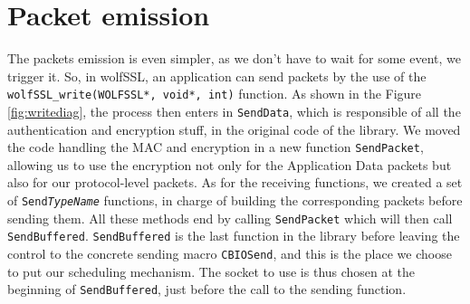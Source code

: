 \section{Packet emission}

The packets emission is even simpler, as we don't have to wait for some event, we trigger it. So, in wolfSSL, an application can send packets by the use of the \texttt{wolfSSL\_write(WOLFSSL*, void*, int)} function. As shown in the Figure \ref{fig:writediag}, the process then enters in \texttt{SendData}, which is responsible of all the authentication and encryption stuff, in the original code of the library. We moved the code handling the MAC and encryption in a new function \texttt{SendPacket}, allowing us to use the encryption not only for the Application Data packets but also for our protocol-level packets. As for the receiving functions, we created a set of \texttt{Send\textit{TypeName}} functions, in charge of building the corresponding packets before sending them. All these methods end by calling \texttt{SendPacket} which will then call \texttt{SendBuffered}. \texttt{SendBuffered} is the last function in the library before leaving the control to the concrete sending macro \texttt{CBIOSend}, and this is the place we choose to put our scheduling mechanism. The socket to use is thus chosen at the beginning of \texttt{SendBuffered}, just before the call to the sending function.

